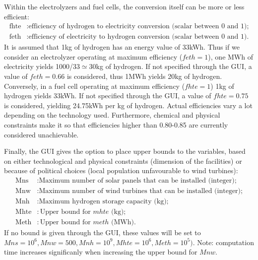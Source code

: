 \documentclass[english]{article}
\numberwithin{definition}{section}
\numberwithin{theorem}{section}
\numberwithin{problem}{section}
\begin{document}
Within the electrolyzers and fuel cells, the conversion itself can be more or less efficient:
\begin{align*}
    \text{fhte} & : \text{efficiency of hydrogen to electricity conversion (scalar between 0 and 1);} \\ 
    \text{feth} & : \text{efficiency of electricity to hydrogen conversion (scalar between 0 and 1).}
\end{align*}
It is assumed that 1kg of hydrogen has an energy value of 33kWh. Thus if we consider an electrolyzer operating at maximum efficiency ($feth=1$), one MWh of electricity yields 1000/33$\simeq$30kg of hydrogen. If not specified through the GUI, a value of $feth=0.66$ is considered, thus 1MWh yields 20kg of hydrogen.
Conversely, in a fuel cell operating at maximum efficiency ($fhte=1$) 1kg of hydrogen yields 33kWh. If not specified through the GUI, a value of $fhte=0.75$ is considered, yielding 24.75kWh per kg of hydrogen. Actual efficiencies vary a lot depending on the technology used. Furthermore, chemical and physical constraints make it so that efficiencies higher than 0.80-0.85 are currently considered unachievable.

Finally, the GUI gives the option to place upper bounds to the variables, based on either technological and physical constraints (dimension of the facilities) or because of political choices (local population unfavourable to wind turbines): 
\begin{align*}
    \text{Mns} & : \text{Maximum number of solar panels that can be installed (integer);} \\ 
    \text{Mnw} & : \text{Maximum number of wind turbines that can be installed (integer);} \\ 
    \text{Mnh} & : \text{Maximum hydrogen storage capacity (kg);}\\
    \text{Mhte} & : \text{Upper bound for \(mhte\) (kg)}; \\ 
    \text{Meth} & : \text{Upper bound for \(meth\) (MWh)}.
\end{align*}
If no bound is given through the GUI, these values will be set to $Mns=10^6, Mnw=500, Mnh=10^9, Mhte=10^6, Meth=10^5)$. Note: computation time increases significanly when increasing the upper bound for $Mnw$.
\end{document}
